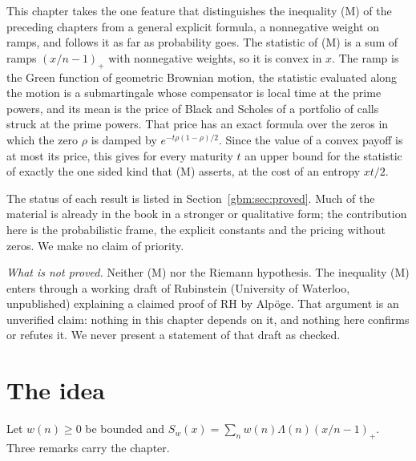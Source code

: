 \label{gbm:ch:main}
This chapter takes the one feature that distinguishes the inequality (M) of the preceding chapters from a general explicit formula, a nonnegative weight on ramps, and follows it as far as probability goes. The statistic of (M) is a sum of ramps $(x/n-1)_+$ with nonnegative weights, so it is convex in $x$. The ramp is the Green function of geometric Brownian motion, the statistic evaluated along the motion is a submartingale whose compensator is local time at the prime powers, and its mean is the price of Black and Scholes of a portfolio of calls struck at the prime powers. That price has an exact formula over the zeros in which the zero $\rho$ is damped by $e^{-t\rho(1-\rho)/2}$. Since the value of a convex payoff is at most its price, this gives for every maturity $t$ an upper bound for the statistic of exactly the one sided kind that (M) asserts, at the cost of an entropy $xt/2$.

The status of each result is listed in Section~\ref{gbm:sec:proved}. Much of the material is already in the book in a stronger or qualitative form; the contribution here is the probabilistic frame, the explicit constants and the pricing without zeros. We make no claim of priority.

\emph{What is not proved.} Neither (M) nor the Riemann hypothesis. The inequality (M) enters through a working draft of Rubinstein \cite{Rub26} (University of Waterloo, unpublished) explaining a claimed proof of RH by Alp\"oge. That argument is an unverified claim: nothing in this chapter depends on it, and nothing here confirms or refutes it. We never present a statement of that draft as checked.

\section{The idea}\label{gbm:sec:idea}

Let $w(n)\ge0$ be bounded and $S_w(x)=\sum_nw(n)\Lambda(n)(x/n-1)_+$. Three remarks carry the chapter.

